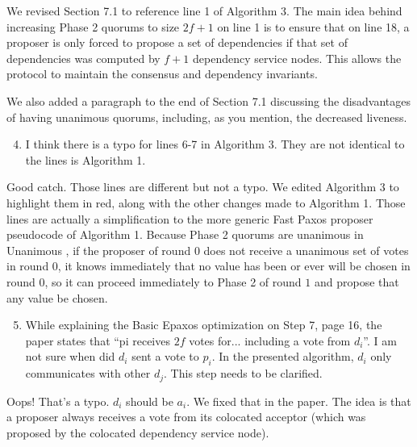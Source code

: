 \documentclass[letterpaper,twocolumn,10pt]{article}
\newenvironment{reviewerquote}
{\list{}{\leftmargin=\parindent\rightmargin=0in}\item[] \itshape \color{ReviewerDarkGray}}%
{\endlist}
\begin{document}
We revised Section 7.1 to reference line 1 of Algorithm 3. The main idea behind
increasing Phase 2 quorums to size $2f+1$ on line 1 is to ensure that on line
18, a proposer is only forced to propose a set of dependencies if that set of
dependencies was computed by $f+1$ dependency service nodes. This allows the
protocol to maintain the consensus and dependency invariants.

We also added a paragraph to the end of Section 7.1 discussing the
disadvantages of having unanimous quorums, including, as you mention, the
decreased liveness.

\begin{reviewerquote}
  \begin{enumerate}
    \setcounter{enumi}{3}
    \item
      I think there is a typo for lines 6-7 in Algorithm 3. They are not
      identical to the lines is Algorithm 1.
  \end{enumerate}
\end{reviewerquote}

Good catch. Those lines are different but not a typo. We edited Algorithm 3 to
highlight them in red, along with the other changes made to Algorithm 1. Those
lines are actually a simplification to the more generic Fast Paxos proposer
pseudocode of Algorithm 1. Because Phase 2 quorums are unanimous in Unanimous
\BPaxos{}, if the proposer of round $0$ does not receive a unanimous set of
votes in round $0$, it knows immediately that no value has been or ever will be
chosen in round $0$, so it can proceed immediately to Phase 2 of round $1$ and
propose that any value be chosen.

\begin{reviewerquote}
  \begin{enumerate}
    \setcounter{enumi}{4}
    \item
      While explaining the Basic Epaxos optimization on Step 7, page 16, the
      paper states that ``pi receives $2f$ votes for... including a vote from
      $d_i$''.  I am not sure when did $d_i$ sent a vote to $p_i$. In the
      presented algorithm, $d_i$ only communicates with other $d_j$. This step
      needs to be clarified.
  \end{enumerate}
\end{reviewerquote}

Oops! That's a typo. $d_i$ should be $a_i$. We fixed that in the paper. The
idea is that a proposer always receives a vote from its colocated acceptor
(which was proposed by the colocated dependency service node).
\end{document}
